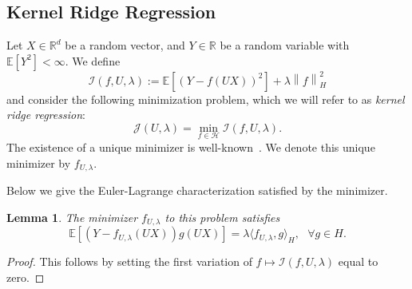 \documentclass[sn-mathphys-num]{sn-jnl}%
\numberwithin{equation}{section}
\newcommand{\R}{\mathbb{R}}
\newcommand{\E}{\mathbb{E}}
\renewcommand{\H}{\mathcal{H}}
\newcommand{\kernel}{K}
\newcommand{\norm}[1]{\left\|{#1}\right\|} %
\newtheorem{lemma}{Lemma}
\renewcommand{\H}{\mathbb{H}}
\renewcommand{\H}{\mathcal{H}}
\newcommand{\profile}{\psi}
\theoremstyle{thmstyleone}%
\theoremstyle{thmstyletwo}%
\newtheorem{example}{Example}%
\theoremstyle{thmstylethree}%
\begin{document}



\subsection{Kernel Ridge Regression} 
Let $X \in \R^d$ be a random vector, and $Y \in \R$ be a random variable with $\E[Y^2] < \infty$. 
We define 
\begin{equation}
	\mathcal{I}(f, U, \lambda) :=  \E[(Y- f(U X))^2] + \lambda \norm{f}_H^2
\end{equation}
and consider the following minimization problem, which we will refer to as \emph{kernel ridge regression}: 
\begin{equation}
	\mathcal{J}(U, \lambda) = \min_{f \in \H} \mathcal{I}(f, U, \lambda).
\end{equation}
The existence of a unique minimizer is well-known~\cite{CuckerSm02}. We denote this unique minimizer by 
$f_{U, \lambda}$. %

Below we give the Euler-Lagrange characterization satisfied by the minimizer.
\vspace{.5em}
\begin{lemma}
\label{lemma:euler-lagrange-identity}
The minimizer $f_{U, \lambda}$ to this problem satisfies 
\begin{equation*}
	\E[(Y- f_{U, \lambda}(U X)) g(U X)] = \lambda \langle f_{U, \lambda}, g\rangle_H,~~~\forall g\in H.
\end{equation*}
\end{lemma} 
\begin{proof}
This follows by setting the first variation of $f \mapsto \mathcal{I}(f,U,\lambda)$ equal to zero.
\end{proof} 
\end{document}

